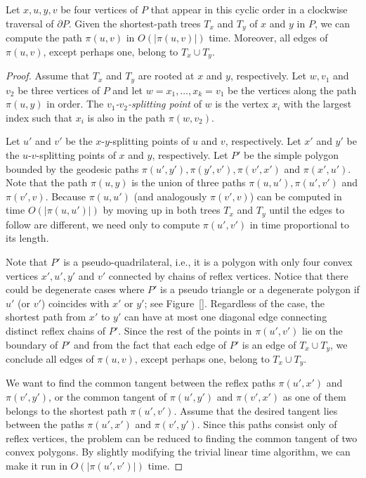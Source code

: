 \documentclass[a4paper,UKenglish]{lipics}
\newcommand{\p}[2]{\ensuremath{\pi(#1, #2)}}
\begin{document}
\begin{lemma}\label{lemma:Suri's lemma}
Let $x, u, y, v$ be four vertices of $P$ that appear in this cyclic order in a clockwise traversal of $\partial P$.
Given the shortest-path trees $T_x$ and $T_y$ of $x$ and $y$ in $P$, 
we can compute the path $\p{u}{v}$ in $O(|\p{u}{v}|)$ time. 
Moreover, all edges of $\p{u}{v}$, except perhaps one, belong to $T_x\cup T_y$.
\end{lemma}
\begin{proof}
Assume that $T_x$ and $T_y$ are rooted at $x$ and $y$, respectively.
Let $w, v_1$ and $v_2$ be three vertices of $P$ and let $w = x_1, \ldots, x_k = v_1$ be the vertices along the path $\p{u}{y}$ in order. The \emph{$v_1$-$v_2$-splitting point} of $w$ is the vertex $x_i$ with the largest index such that $x_i$ is also in the path $\p{w}{v_2}$.

Let $u'$  and $v'$ be the $x$-$y$-splitting points of $u$ and $v$, respectively.
Let $x'$ and $y'$ be the $u$-$v$-splitting points of $x$ and $y$, respectively.
Let $P'$ be the simple polygon bounded by the geodesic paths $\p{u'}{y'}, \p{y'}{v'}, \p{v'}{x'}$ and $\p{x'}{u'}$.
Note that the path $\p{u}{y}$ is the union of three paths $\p{u}{u'}, \p{u'}{v'}$ and $\p{v'}{v}$.
Because $\p{u}{u'}$ (and analogously $\p{v'}{v}$) can be computed in time $O(|\p{u}{u'}|)$ by moving up in both trees $T_x$ and $T_y$ until the edges to follow are different, we need only to compute $\p{u'}{v'}$ in time proportional to its length.

Note that $P'$ is a pseudo-quadrilateral, i.e., it is a polygon with only four convex vertices $x',u', y'$ and $v'$ connected by chains of reflex vertices. 
Notice that there could be degenerate cases where $P'$ is a pseudo triangle or a degenerate polygon if $u'$ (or $v'$) coincides with $x'$ or $y'$; see Figure~\ref{}. 
Regardless of the case, the shortest path from $x'$ to $y'$ can have at most one diagonal edge connecting distinct reflex chains of $P'$. Since the rest of the points in $\p{u'}{v'}$ lie on the boundary of $P'$ and from the fact that each edge of $P'$ is an edge of $T_x\cup T_y$, we conclude all edges of $\p{u}{v}$, except perhaps one, belong to $T_x\cup T_y$.

We want to find the common tangent between the reflex paths $\p{u'}{x'}$ and $\p{v'}{y'}$, or the common tangent of $\p{u'}{y'}$ and $\p{v'}{x'}$ as one of them belongs to the shortest path $\p{u'}{v'}$.
Assume that the desired tangent lies between the paths $\p{u'}{x'}$ and $\p{v'}{y'}$. 
Since this paths consist only of reflex vertices, the problem can be reduced to finding the common tangent of two convex polygons. By slightly modifying the trivial linear time algorithm, we can make it run in $O(|\p{u'}{v'}|)$ time. 
\end{proof}
\end{document}
